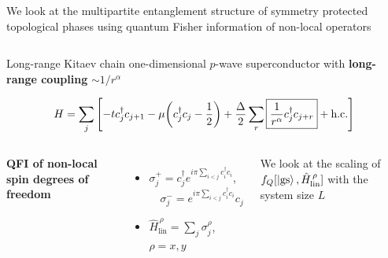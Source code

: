 \documentclass[9pt, aspectratio=169]{beamer}
\begin{document}
\begin{frame}
\begin{columns}
        \vspace*{0.1cm}


        We look at the multipartite entanglement structure of symmetry protected topological phases using quantum Fisher information of non-local operators

    \end{columns}

\end{frame}

\begin{frame}{Long-range Kitaev chain}
    one-dimensional $p$-wave superconductor with \textbf{long-range coupling} $\sim 1/r^{\alpha}$

    \small
    \begin{equation*}
        H = \sum_{j} \qty[
            -t c_j^{\dagger} c_{j+1}
            -\mu \qty( c_j^{\dagger} c_j - \frac{1}{2} )
            + \frac{\Delta}{2} \sum_{r} \boxed{\frac{1}{r^{\alpha}} c_j^{\dagger} c_{j+r}}
            + \text{h.c.}
        ]
    \end{equation*}

    \begin{columns}\small
        \textbf{QFI of non-local spin degrees of freedom}
        \begin{itemize}\footnotesize
            \item $\sigma_j^+ = c^{\dagger}_j e^{i \pi \sum_{i < j} c_i^{\dagger} c_i} $, ~~$\sigma_j^- = e^{i \pi \sum_{i < j} c_i^{\dagger} c_i} c_j $
            \item $\hat{H}_{\text{lin}}^{\,\rho} = \sum_{j} \sigma^{\rho}_{j} $, ~$\rho=x,y$
        \end{itemize}
        We look at the scaling of $f_Q[\ket{\text{gs}}, \hat{H}_{\text{lin}}^{\,\rho}]$ with the system size $L$
        \\[10pt]

        

    \end{columns}
\end{frame}
\end{document}
